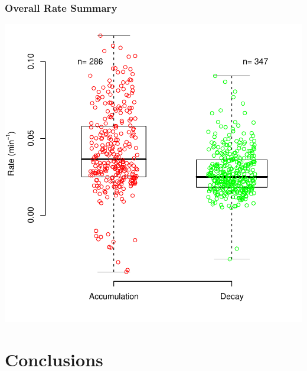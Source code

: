 \documentclass{beamer}
\begin{document}
\begin{frame}
	\frametitle{Overall Rate Summary}
	\begin{center}
	\includegraphics[height=0.85\textheight]{figures/analysis/accum_decay_single_colors}
	\end{center}
\end{frame}

\section[]{Conclusions}
\end{document}
